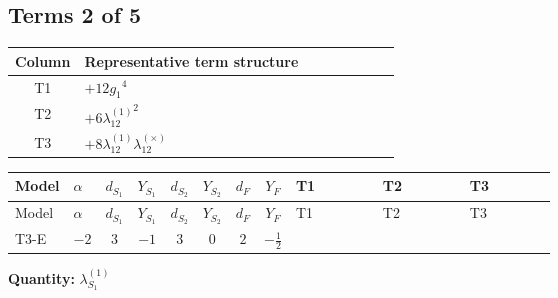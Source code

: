 \documentclass[8pt]{article}
\begin{document}
\begin{landscape}
\subsection*{Terms 2 of 5}
\begin{center}
\begin{tabular}{@{}c >{\raggedright\arraybackslash}p{0.82\linewidth}@{}}
\toprule
Column & Representative term structure \\
\midrule
T1 & \(\displaystyle +12 {g_1}^4\) \\
\midrule
T2 & \(\displaystyle +6 {\lambda_{12}^{(1)}}^2\) \\
\midrule
T3 & \(\displaystyle +8 {\lambda_{12}^{(1)}} {\lambda_{12}^{(\times)}}\) \\
\midrule
\bottomrule
\end{tabular}
\end{center}
\smallskip
\tiny
\begin{longtable}{@{}llcccccc >{\raggedright\arraybackslash}p{0.21\linewidth} >{\raggedright\arraybackslash}p{0.21\linewidth} >{\raggedright\arraybackslash}p{0.21\linewidth}@{}}
\toprule
Model & $\alpha$ & $d_{S_1}$ & $Y_{S_1}$ & $d_{S_2}$ & $Y_{S_2}$ & $d_F$ & $Y_F$ & T1 & T2 & T3 \\
\midrule
\endfirsthead
\toprule
Model & $\alpha$ & $d_{S_1}$ & $Y_{S_1}$ & $d_{S_2}$ & $Y_{S_2}$ & $d_F$ & $Y_F$ & T1 & T2 & T3 \\
\midrule
\endhead
T3-E & $-2$ & $3$ & $-1$ & $3$ & $0$ & $2$ & $-\frac{1}{2}$ & \scriptsize\adjustbox{max width=\linewidth}{$\begin{gathered} +12 {g_1}^4\end{gathered}$} & \scriptsize\adjustbox{max width=\linewidth}{$\begin{gathered} +6 {\lambda_{12}^{(1)}}^2\end{gathered}$} & \scriptsize\adjustbox{max width=\linewidth}{$\begin{gathered} +8 {\lambda_{12}^{(1)}} {\lambda_{12}^{(\times)}}\end{gathered}$} \\
\midrule
\bottomrule
\end{longtable}
\clearpage
\noindent\textbf{Quantity: }$\lambda_{S_1}^{(1)}$\par\smallskip

\end{landscape}
\end{document}
